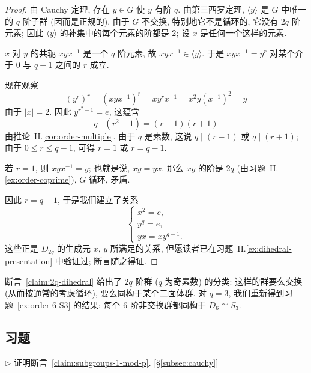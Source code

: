 \begin{proof}
由 Cauchy 定理, 存在 $y \in G$ 使 $y$ 有阶 $q$. 由第三西罗定理, $\langle y \rangle$ 是 $G$ 中唯一的 $q$ 阶子群 (因而是正规的). 由于 $G$ 不交换, 特别地它不是循环的, 它没有 $2q$ 阶元素; 因此 $\langle y \rangle$ 的补集中的每个元素的阶都是 $2$; 设 $x$ 是任何一个这样的元素.

$x$ 对 $y$ 的共轭 $xyx^{-1}$ 是一个 $q$ 阶元素, 故 $xyx^{-1} \in \langle y \rangle$. 于是 $xyx^{-1} = y^r$ 对某个介于 $0$ 与 $q-1$ 之间的 $r$ 成立.

现在观察
\[
(y^r)^r = (xyx^{-1})^r = xy^rx^{-1} = x^2y(x^{-1})^2 = y
\]
由于 $|x| = 2$. 因此 $y^{r^2-1} = e$, 这蕴含
\[
q \mid (r^2 - 1) = (r-1)(r+1)
\]
由推论~II.\ref{cor:order-multiple}. 由于 $q$ 是素数, 这说 $q \mid (r-1)$ 或 $q \mid (r+1)$; 由于 $0 \leq r \leq q-1$, 可得 $r = 1$ 或 $r = q-1$.

若 $r = 1$, 则 $xyx^{-1} = y$; 也就是说, $xy = yx$. 那么 $xy$ 的阶是 $2q$ (由习题~II.\ref{ex:order-coprime}), $G$ 循环, 矛盾.

因此 $r = q - 1$, 于是我们建立了关系
\[
\begin{cases}
	x^2 = e, \\
	y^q = e, \\
	yx = xy^{q-1}.
\end{cases}
\]
这些正是 $D_{2q}$ 的生成元 $x$, $y$ 所满足的关系, 但愿读者已在习题~II.\ref{ex:dihedral-presentation} 中验证过; 断言随之得证.
\end{proof}

断言~\ref{claim:2q-dihedral} 给出了 $2q$ 阶群 ($q$ 为奇素数) 的分类: 这样的群要么交换 (从而按通常的考虑循环), 要么同构于某个二面体群. 对 $q = 3$, 我们重新得到习题~\ref{ex:order-6-S3} 的结果: 每个 $6$ 阶非交换群都同构于 $D_6 \cong S_3$.

\subsection*{习题}
{}

\begin{prob}
\label{ex:prove-claim-2-2}
$\triangleright$ 证明断言~\ref{claim:subgroups-1-mod-p}. [\S\ref{subsec:cauchy}]
\end{prob}

